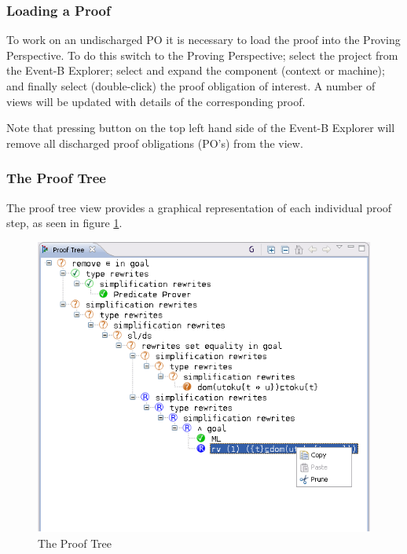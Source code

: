 \subsubsection{Loading a Proof}

To work on an undischarged PO it is necessary to load the proof into the Proving Perspective. To do this switch to the Proving Perspective; select the project from the Event-B Explorer; select and expand the component (context or machine); and finally select (double-click) the proof obligation of interest. A number of views will be updated with details of the corresponding proof. 

Note that pressing  button on the top left hand side of the \textsf{Event-B Explorer} will remove all discharged proof obligations (PO's) from the view. 

\subsubsection{The Proof Tree}

The proof tree view provides a graphical representation of each individual proof step, as seen in figure \ref{fig_ref_01_proving_perspective2}.

\begin{figure}[!h]
\begin{center}
	\includegraphics{img/reference/ref_01_proving_perspective2.png}
	\caption{The Proof Tree}
	\label{fig_ref_01_proving_perspective2}
\end{center}
\end{figure}


